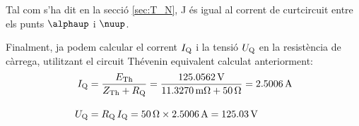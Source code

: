 \begin{exemple}
    Tal com s'ha dit en la secció \ref{sec:T_N}, J és igual al
    corrent de curtcircuit entre els punts $\alphaup$ i $\nuup$.

    Finalment, ja podem calcular el corrent $I_\mathrm{Q}$ i la tensió $U_\mathrm{Q}$ en la
    resistència de càrrega, utilitzant el circuit Thévenin equivalent calculat anteriorment:
    \begin{align*}
        I_\mathrm{Q} &= \frac{E_\mathrm{Th}}{Z_\mathrm{Th} + R_\mathrm{Q}} = \frac{\qty{125,0562}{V}}
        {\qty{11,3270}{m\ohm} + \qty{50}{\ohm}} = \qty{2,5006}{A} \\[2ex]
        U_\mathrm{Q} &=  R_\mathrm{Q} \,I_\mathrm{Q} = \qty{50}{\ohm} \times \qty{2,5006}{A} =
        \qty{125,03}{V}
    \end{align*}
\end{exemple}


